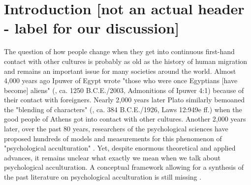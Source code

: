 \documentclass[man, 12pt, a4paper]{apa7}
\begin{document}
%
%
%

\section{Introduction [not an actual header - label for our discussion]}

The question of how people change when they get into continuous first-hand contact with other cultures is probably as old as the history of human migration and remains an important issue for many societies around the world. 
Almost 4,000 years ago Ipuwer of Egypt wrote "those who were once Egyptians [have become] aliens" (\citeauthor{Ipuwer2003}, ca. 1250 B.C.E./2003, Admonitions of Ipuwer 4:1) because of their contact with foreigners. Nearly 2,000 years later Plato similarly bemoaned the "blending of characters" (\citeauthor{Plato1926}, ca. 384 B.C.E./1926, Laws 12:949e ff.) when the good people of Athens got into contact with other cultures. Another 2,000 years later, over the past 80 years, researchers of the psychological sciences have proposed hundreds of models and measurements for this phenomenon of "psychological acculturation" \citep[][]{Rudmin2003a}. Yet, despite enormous theoretical and applied advances, it remains unclear what exactly we mean when we talk about psychological acculturation. A conceptual framework allowing for a synthesis of the past literature on psychological acculturation is still missing \citep{Birman2014c}.
\end{document}
